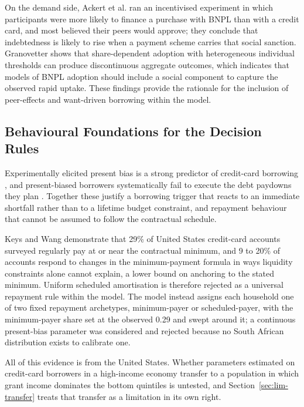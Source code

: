 On the demand side, Ackert et al. \cite{ackert2025bnpl} ran an incentivised experiment in which
participants were more likely to finance a purchase with \ac{BNPL} than with a credit card, and
most believed their peers would approve; they conclude that indebtedness is likely to rise when a
payment scheme carries that social sanction.
Granovetter \cite{granovetter1978threshold} shows that share-dependent adoption with
heterogeneous individual thresholds can produce discontinuous aggregate outcomes, which indicates that
models of \ac{BNPL} adoption should include a social component to capture the observed rapid uptake. These findings provide the rationale for
the inclusion of peer-effects and want-driven borrowing within the model.



\subsection{Behavioural Foundations for the Decision Rules}
\label{sec:lit-behavioural}

Experimentally elicited present bias is a strong predictor of credit-card borrowing
\cite{meier2010present}, and present-biased borrowers systematically fail to execute the debt
paydowns they plan \cite{Kuchler2021}. Together these justify a borrowing trigger that reacts to
an immediate shortfall rather than to a lifetime budget constraint, and repayment behaviour that
cannot be assumed to follow the contractual schedule.

Keys and Wang \cite{Keys2019} demonstrate that 29\% of United States credit-card
accounts surveyed regularly pay at or near the contractual minimum, and 9 to 20\% of accounts respond to
changes in the minimum-payment formula in ways liquidity constraints alone cannot explain, a lower
bound on anchoring to the stated minimum. Uniform scheduled amortisation is therefore rejected as
a universal repayment rule within the model. The model instead assigns each
household one of two fixed repayment archetypes, minimum-payer or scheduled-payer, with the
minimum-payer share set at the observed 0.29 and swept around it; a continuous present-bias
parameter was considered and rejected because no South African distribution exists to calibrate
one.

All of this evidence is from the United States. Whether parameters estimated on credit-card
borrowers in a high-income economy transfer to a population in which grant income dominates the
bottom quintiles is untested, and Section~\ref{sec:lim-transfer} treats that transfer as a
limitation in its own right.

